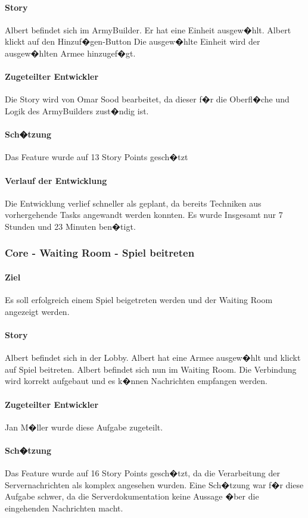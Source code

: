 \documentclass[12pt, titlepage]{scrartcl}
\begin{document}
		\paragraph{Story} Albert befindet sich im ArmyBuilder. Er hat eine Einheit ausgew�hlt. Albert klickt auf den Hinzuf�gen-Button Die ausgew�hlte Einheit wird der ausgew�hlten Armee hinzugef�gt.
		\paragraph{Zugeteilter Entwickler} Die Story wird von Omar Sood bearbeitet, da dieser f�r die Oberfl�che und Logik des ArmyBuilders zust�ndig ist.
		\paragraph{Sch�tzung}
		Das Feature wurde auf 13 Story Points gesch�tzt
		\paragraph{Verlauf der Entwicklung} 
		Die Entwicklung verlief schneller als geplant, da bereits Techniken aus vorhergehende Tasks angewandt werden konnten. Es wurde Insgesamt nur 7 Stunden und 23 Minuten ben�tigt.
		
		\subsubsection{Core - Waiting Room - Spiel beitreten}
		\paragraph{Ziel} Es soll erfolgreich einem Spiel beigetreten werden und der Waiting Room angezeigt werden.
		\paragraph{Story} Albert befindet sich in der Lobby. Albert hat eine Armee ausgew�hlt und klickt auf Spiel beitreten. Albert befindet sich nun im Waiting Room. Die Verbindung wird korrekt aufgebaut und es k�nnen Nachrichten empfangen werden.
		\paragraph{Zugeteilter Entwickler} Jan M�ller wurde diese Aufgabe zugeteilt.
		\paragraph{Sch�tzung}
		Das Feature wurde auf 16 Story Points gesch�tzt, da die Verarbeitung der Servernachrichten als komplex angesehen wurden. Eine Sch�tzung war f�r diese Aufgabe schwer, da die Serverdokumentation keine Aussage �ber die eingehenden Nachrichten macht.
\end{document}
